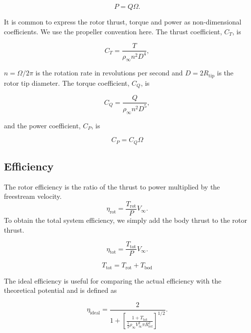 \begin{equation}
    P = Q\Omega.
\end{equation}

It is common to express the rotor thrust, torque and power as non-dimensional coefficients.
%
We use the propeller convention here.
%
The thrust coefficient, \(C_T\), is

\begin{equation}
    C_T = \frac{T}{\rho_\infty n^2 D^4},
\end{equation}

\where \(n=\Omega/2\pi\) is the rotation rate in revolutions per second and \(D=2R_\text{tip}\) is the rotor tip diameter.
%
The torque coefficient, \(C_Q\), is

\begin{equation}
    C_Q = \frac{Q}{\rho_\infty n^2 D^5},
\end{equation}

\noindent and the power coefficient, \(C_P\), is

\begin{equation}
    C_P = C_Q \Omega
\end{equation}


\subsection{Efficiency}

The rotor efficiency is the ratio of the thrust to power multiplied by the freestream velocity.
%
\begin{equation}
    \eta_\text{rot} = \frac{T_\text{rot}}{P} V_\infty.
\end{equation}
%
To obtain the total system efficiency, we simply add the body thrust to the rotor thrust.

\begin{equation}
    \eta_\text{tot} = \frac{T_\text{tot}}{P} V_\infty.
\end{equation}

\where

\begin{equation}
    T_\text{tot} = T_\text{rot}+T_\text{bod}
\end{equation}


\noindent The ideal efficiency is useful for comparing the actual efficiency with the theoretical potential and is defined as

\begin{equation}
    \eta_\text{ideal} = \frac{2}{1 + \left[\frac{1 + T_\text{tot}}{\frac{1}{2}\rho_\infty V_\infty^2 \pi R_\text{ref}^2}\right]^{1/2}}.
\end{equation}

